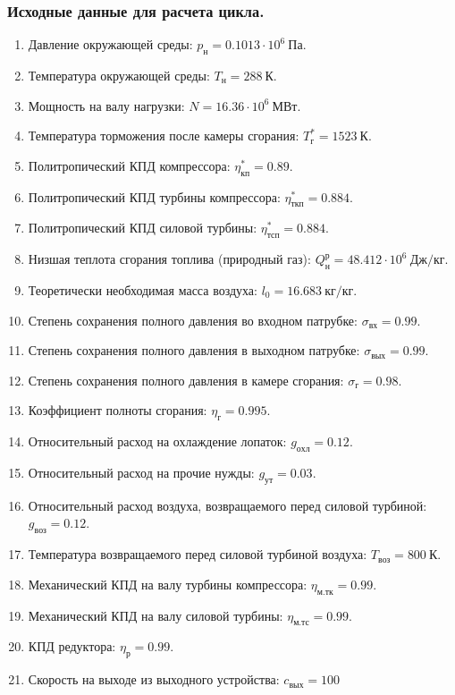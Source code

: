 \documentclass[a4paper,12pt]{article}
\begin{document}
    \subsubsection{Исходные данные для расчета цикла.}
%    
\begin{enumerate}

	\item Давление окружающей среды: $p_{н} = 0.1013 \cdot 10^6\ Па$.
	\item Температура окружающей среды: $T_{н} = 288\ К$.
	\item Мощность на валу нагрузки: $ N = 16.36 \cdot 10^6\ МВт $.
	\item Температура торможения после камеры сгорания: $T_г^* = 1523\ К$.
	\item Политропический КПД компрессора: $\eta^*_{к п} = 0.89 $.
	\item Политропический КПД турбины компрессора: $\eta^*_{ткп} = 0.884$.
	\item Политропический КПД силовой турбины: $\eta^*_{тсп} = 0.884$.
	\item Низшая теплота сгорания топлива (природный газ): $Q^р_н = 48.412 \cdot 10^6\ Дж/кг$.
	\item Теоретически необходимая масса воздуха: $l_0 = 16.683\ кг/кг$.

	\item Степень сохранения полного давления во входном патрубке: $\sigma_{вх} = 0.99$.
	\item Степень сохранения полного давления в выходном патрубке: $\sigma_{вых} = 0.99$.
	\item Степень сохранения полного давления в камере сгорания: $\sigma_г = 0.98$.
	\item Коэффициент полноты сгорания: $\eta_г = 0.995 $.
	\item Относительный расход на охлаждение лопаток: $g_{охл} = 0.12$.
	\item Относительный расход на прочие нужды: $g_{ут} = 0.03$.
	\item Относительный расход воздуха, возвращаемого перед силовой турбиной: $g_{воз} = 0.12$.
	\item Температура возвращаемого перед силовой турбиной воздуха: $T_{воз} = 800\ К$.
	\item Механический КПД на валу турбины компрессора: $\eta_{м.тк} = 0.99$.
	\item Механический КПД на валу силовой турбины: $\eta_{м.тс} = 0.99$.
	\item КПД редуктора: $ \eta_р = 0.99$.
	\item Скорость на выходе из выходного устройства: $ c_{вых} = 100 $

\end{enumerate}
\end{document}

